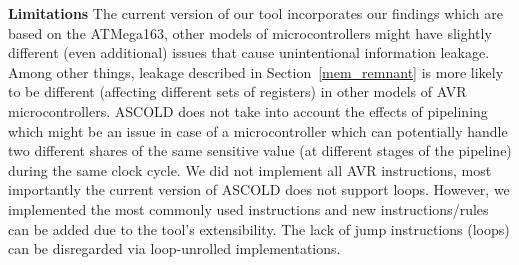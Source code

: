 \textbf{Limitations} The current version of our tool
incorporates our findings which are based on the ATMega163, other models of microcontrollers
might have slightly different (even additional) issues that cause unintentional information leakage.
Among other things, leakage described in Section~\ref{mem_remnant} is more likely to be different (affecting different sets of registers) in other models of AVR microcontrollers.
ASCOLD does not take into account the effects of pipelining which might be an issue
in case of a microcontroller which can potentially handle two different shares of the same sensitive
value (at different stages of the pipeline) during the same clock cycle.
We did not implement all AVR instructions, most importantly
the current version of ASCOLD does not support loops.
However, we implemented the most commonly used instructions and new instructions/rules
can be added due to the tool's extensibility. The lack of jump instructions (loops)
can be disregarded via loop-unrolled implementations.

